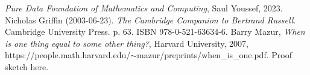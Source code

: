 \documentclass[11pt]{article}
\begin{document}
\begin{thebibliography}{10}
 {\it Pure Data Foundation of Mathematics and Computing}, Saul Youssef, 2023.
 Nicholas Griffin (2003-06-23). {\it The Cambridge Companion to Bertrand Russell}. Cambridge University Press. p. 63. ISBN 978-0-521-63634-6.
 Barry Mazur, {\it When is one thing equal to some other thing?}, Harvard University, 2007,  {\rm https://people.math.harvard.edu/}$\sim${\rm mazur/preprints/when\_is\_one.pdf}. 
 Proof sketch here.
\end{thebibliography}
\end{document}
